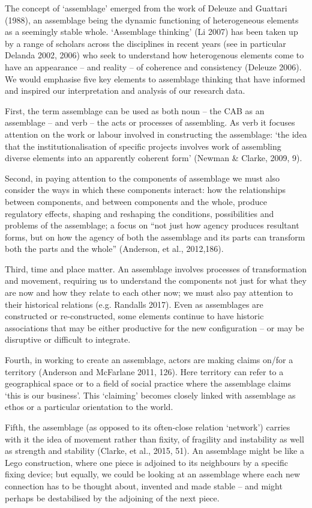 \par
The concept of ‘assemblage’ emerged from the work of Deleuze and Guattari (1988), an assemblage being the dynamic functioning of heterogeneous elements as a seemingly stable whole. ‘Assemblage thinking’ (Li 2007) has been taken up by a range of scholars across the disciplines in recent years (see in particular Delanda 2002, 2006) who seek to understand how heterogenous elements come to have an appearance – and reality – of coherence and consistency (Deleuze 2006). We would emphasise five key elements to assemblage thinking that have informed and inspired our interpretation and analysis of our research data.
\par
First, the term assemblage can be used as both noun – the CAB as an assemblage – and verb – the acts or processes of assembling. As verb it focuses attention on the work or labour involved in constructing the assemblage: ‘the idea that the institutionalisation of specific projects involves work of assembling diverse elements into an apparently coherent form’ (Newman \& Clarke, 2009, 9). 
\par
Second, in paying attention to the components of assemblage we must also consider the ways in which these components interact: how the relationships between components, and between components and the whole, produce regulatory effects, shaping and reshaping the conditions, possibilities and problems of the assemblage; a focus on “not just how agency produces resultant forms, but on how the agency of both the assemblage and its parts can transform both the parts and the whole” (Anderson, et al., 2012,186).
\par
Third, time and place matter. An assemblage involves processes of transformation and movement, requiring us to understand the components not just for what they are now and how they relate to each other now; we must also pay attention to their historical relations (e.g. Randalls 2017). Even as assemblages are constructed or re-constructed, some elements continue to have historic associations that may be either productive for the new configuration – or may be disruptive or difficult to integrate. 
\par
Fourth, in working to create an assemblage, actors are making claims on/for a territory (Anderson and McFarlane 2011, 126). Here territory can refer to a geographical space or to a field of social practice where the assemblage claims ‘this is our business’. This ‘claiming’ becomes closely linked with assemblage as ethos or a particular orientation to the world. 
\par
Fifth, the assemblage (as opposed to its often-close relation ‘network’) carries with it the idea of movement rather than fixity, of fragility and instability as well as strength and stability (Clarke, et al., 2015, 51). An assemblage might be like a Lego construction, where one piece is adjoined to its neighbours by a specific fixing device; but equally, we could be looking at an assemblage where each new connection has to be thought about, invented and made stable – and might perhaps be destabilised by the adjoining of the next piece. 


